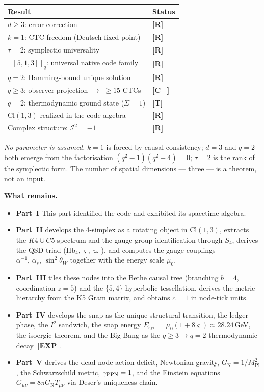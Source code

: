 \documentclass[11pt,a4paper]{article}
\newcommand{\Rmark}{\textcolor{green!50!black}{\textbf{[R]}}}
\newcommand{\Cpmark}{\textcolor{blue!70!black}{\textbf{[C+]}}}
\newcommand{\Tmark}{\textcolor{orange!70!black}{\textbf{[T]}}}
\newcommand{\EXPmark}{\textcolor{red!50!black}{\textbf{[EXP]}}}
\newcommand{\Cq}[4]{[\![#1,#2,#3]\!]_{#4}}
\providecommand{\Cl}[1]{\mathrm{Cl}(#1)}
\providecommand{\Hbfour}{\mathrm{Hb}_4}
\providecommand{\gs}{\varsigma}
\providecommand{\specbond}{\varpi}
\providecommand{\Mpl}{M_{\mathrm{Pl}}}
\providecommand{\murad}{\mu_0}
\providecommand{\GN}{G_{\mathrm{N}}}
\providecommand{\Esyn}{E_{\mathrm{syn}}}
\begin{document}
\begin{center}
\renewcommand{\arraystretch}{1.25}
\begin{tabular}{ll}
\toprule
\textbf{Result} & \textbf{Status} \\
\midrule
$d\geq3$: error correction & \Rmark \\
$k=1$: CTC-freedom (Deutsch fixed point) & \Rmark \\
$\tau=2$: symplectic universality & \Rmark \\
$\Cq{5}{1}{3}{q}$: universal native code family & \Rmark \\
$q=2$: Hamming-bound unique solution & \Rmark \\
$q\geq3$: observer projection $\to$ $\geq15$ CTCs & \Cpmark \\
$q=2$: thermodynamic ground state ($\Sigma=1$) & \Tmark \\
$\Cl{1,3}$ realized in the code algebra & \Rmark \\
Complex structure: $\mathcal{I}^2=-1$ & \Rmark \\
\bottomrule
\end{tabular}
\end{center}

\noindent
\emph{No parameter is assumed.} $k=1$ is forced by causal consistency; $d=3$ and $q=2$ both emerge from the factorisation $(q^2-1)(q^2-4)=0$; $\tau=2$ is the rank of the symplectic form. The number of spatial dimensions --- three --- is a theorem, not an input.

\medskip\noindent
\textbf{What remains.}\quad
\begin{itemize}
    \item \textbf{Part~I} This part identified the code and exhibited its spacetime algebra. 
    \item \textbf{Part~II} develops the 4-simplex as a rotating object in $\Cl{1,3}$, extracts the $K4 \cup C5$ spectrum and the gauge group identification through $S_4$, derives the QSD triad ($\Hbfour, \gs, \specbond$), and computes the gauge couplings $\alpha^{-1},\,\alpha_s,\,\sin^2\theta_W$ together with the energy scale $\murad$. 
    \item \textbf{Part~III} tiles these nodes into the Bethe causal tree (branching $b=4$, coordination $z=5$) and the $\{5,4\}$ hyperbolic tessellation, derives the metric hierarchy from the K5 Gram matrix, and obtains $c=1$ in node-tick units. 
    \item \textbf{Part~IV} develops the snap as the unique structural transition, the ledger phase, the $I^2$ sandwich, the snap energy $\Esyn=\murad(1+8\gs)\approx28.24$\,GeV, the isoergic theorem, and the Big Bang as the $q\geq3\to q=2$ thermodynamic decay~\EXPmark. 
    \item \textbf{Part~V} derives the dead-node action deficit, Newtonian gravity, $\GN=1/\Mpl^2$, the Schwarzschild metric, $\gamma_{\rm PPN}=1$, and the Einstein equations $G_{\mu\nu}=8\pi\GN T_{\mu\nu}$ via Deser's uniqueness chain.
\end{itemize}




\end{document}
